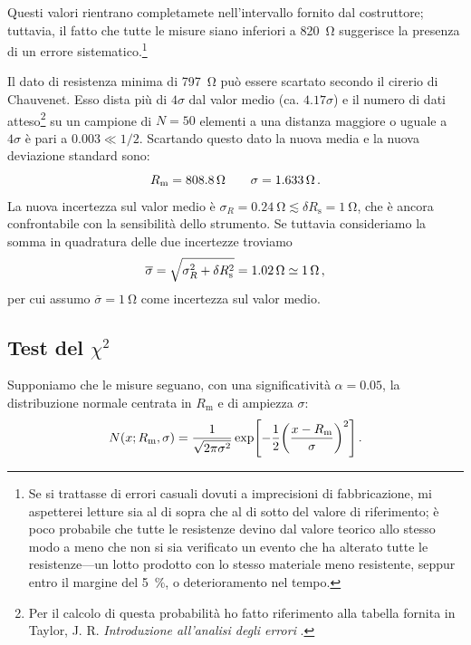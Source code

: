             Questi valori rientrano completamete nell'intervallo fornito dal costruttore; tuttavia, il fatto che tutte le misure siano inferiori a \SI{820}{\ohm} suggerisce la presenza di un errore sistematico.\footnote{Se si trattasse di errori casuali dovuti a imprecisioni di fabbricazione, mi aspetterei letture sia al di sopra che al di sotto del valore di riferimento; è poco probabile che tutte le resistenze devino dal valore teorico allo stesso modo a meno che non si sia verificato un evento che ha alterato tutte le resistenze---un lotto prodotto con lo stesso materiale meno resistente, seppur entro il margine del \SI{5}{\%}, o deterioramento nel tempo.}

            Il dato di resistenza minima di \SI{797}{\ohm} può essere scartato secondo il cirerio di Chauvenet. Esso dista più di $4\sigma$ dal valor medio (ca. $\num{4.17}\sigma$) e il numero di dati atteso\footnote{Per il calcolo di questa probabilità ho fatto riferimento alla tabella fornita in Taylor, J. R. \textit{Introduzione all'analisi degli errori} \cite{Taylor1999-me}.} su un campione di $N = 50$ elementi a una distanza maggiore o uguale a $4\sigma$ è pari a $\num{0.003} \ll 1/2$. Scartando questo dato la nuova media e la nuova deviazione standard sono:
            \begin{equation*}
                R_\text{m} = \SI{808.8}{\ohm}
                \qquad
                \sigma = \SI{1.633}{\ohm}
                \,.
            \end{equation*}
            La nuova incertezza sul valor medio è $\sigma_R = \SI{0.24}{\ohm} \lesssim \delta R_\text{s} = \SI{1}{\ohm}$, che è ancora confrontabile con la sensibilità dello strumento. Se tuttavia consideriamo la somma in quadratura delle due incertezze troviamo
            \begin{equation*}
                \overline{\sigma}
                = \sqrt{\sigma_R^2 + \delta R_\text{s}^2}
                = \SI{1.02}{\ohm}
                \simeq \SI{1}{\ohm}
                \,,
            \end{equation*}
            per cui assumo $\overline{\sigma} = \SI{1}{\ohm}$ come incertezza sul valor medio.

        \subsection{Test del $\chi^2$}
            Supponiamo che le misure seguano, con una significatività $\alpha = \num{0.05}$, la distribuzione normale centrata in $R_\text{m}$ e di ampiezza $\sigma$:
            \begin{equation*}
                N\pqty{x; R_\text{m}, \sigma}
                = \frac{1}{\sqrt{2\pi\sigma^2}} \exp[ -\frac{1}{2}\pqty{\frac{x - R_\text{m}}{\sigma}}^2]
                \myperiod
            \end{equation*}
            
